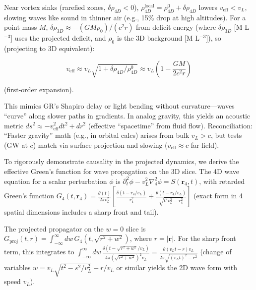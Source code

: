 Near vortex sinks (rarefied zones, $\delta \rho_{4D} < 0$), $\rho_{4D}^{\text{local}} = \rho_{4D}^0 + \delta \rho_{4D}$ lowers $v_{\text{eff}} < v_L$, slowing waves like sound in thinner air (e.g., 15\% drop at high altitudes). For a point mass $M$, $\delta \rho_{3D} \approx - (G M \rho_0) / (c^2 r)$ from deficit energy (where $\delta \rho_{3D}$ [M L$^{-3}$] uses the projected deficit, and $\rho_0$ is the 3D background [M L$^{-3}$]), so (projecting to 3D equivalent):

\[
v_{\text{eff}} \approx v_L \sqrt{1 + \delta \rho_{4D} / \rho_{4D}^0} \approx v_L \left(1 - \frac{G M}{2 c^2 r}\right)
\]

(first-order expansion).

This mimics GR's Shapiro delay or light bending without curvature---waves ``curve'' along slower paths in gradients. In analog gravity, this yields an acoustic metric $ds^2 \approx - v_{\text{eff}}^2 dt^2 + dr^2$ (effective ``spacetime'' from fluid flow). Reconciliation: ``Faster gravity'' math (e.g., in orbital calcs) arises from bulk $v_L > c$, but tests (GW at $c$) match via surface projection and slowing ($v_{\text{eff}} \approx c$ far-field).

To rigorously demonstrate causality in the projected dynamics, we derive the effective Green's function for wave propagation on the 3D slice. The 4D wave equation for a scalar perturbation $\phi$ is $\partial_t^2 \phi - v_L^2 \nabla_4^2 \phi = S(\mathbf{r}_4, t)$, with retarded Green's function $G_4(t, \mathbf{r}_4) = \frac{\theta(t)}{2\pi v_L^2} \left[ \frac{\delta(t - r_4 / v_L)}{r_4^2} + \frac{\theta(t - r_4 / v_L)}{\sqrt{t^2 v_L^2 - r_4^2}} \right]$ (exact form in 4 spatial dimensions includes a sharp front and tail).

The projected propagator on the $w=0$ slice is $G_{\text{proj}}(t, r) = \int_{-\infty}^\infty dw \, G_4(t, \sqrt{r^2 + w^2})$, where $r = |\mathbf{r}|$. For the sharp front term, this integrates to $\int_{-\infty}^\infty dw \, \frac{\delta(t - \sqrt{r^2 + w^2} / v_L)}{4\pi (\sqrt{r^2 + w^2})^2 v_L} = \frac{\theta(v_L t - r) v_L}{2\pi \sqrt{(v_L t)^2 - r^2}}$ (change of variables $w = v_L \sqrt{t^2 - s^2 / v_L^2} - r / v_L$ or similar yields the 2D wave form with speed $v_L$).


